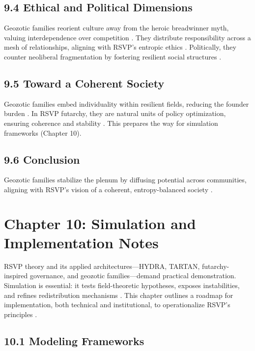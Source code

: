 \documentclass[12pt]{article}
\begin{document}
{{\subsection*{9.4 Ethical and Political Dimensions}

Geozotic families reorient culture away from the heroic breadwinner myth, valuing interdependence over competition \citep{ortega1957}. They distribute responsibility across a mesh of relationships, aligning with RSVP’s entropic ethics \citep{whitehead1978}. Politically, they counter neoliberal fragmentation by fostering resilient social structures \citep{deleuze1987}.

\subsection*{9.5 Toward a Coherent Society}

Geozotic families embed individuality within resilient fields, reducing the founder burden \citep{zuboff2019}. In RSVP futarchy, they are natural units of policy optimization, ensuring coherence and stability \citep{hanson2003}. This prepares the way for simulation frameworks (Chapter 10).

\subsection*{9.6 Conclusion}

Geozotic families stabilize the plenum by diffusing potential across communities, aligning with RSVP’s vision of a coherent, entropy-balanced society \citep{whitehead1978, deleuze1987}.

\section*{Chapter 10: Simulation and Implementation Notes}

RSVP theory and its applied architectures—HYDRA, TARTAN, futarchy-inspired governance, and geozotic families—demand practical demonstration. Simulation is essential: it tests field-theoretic hypotheses, exposes instabilities, and refines redistribution mechanisms \citep{bird1988}. This chapter outlines a roadmap for implementation, both technical and institutional, to operationalize RSVP’s principles \citep{milewski2018}.

\subsection*{10.1 Modeling Frameworks}

}}
\end{document}
